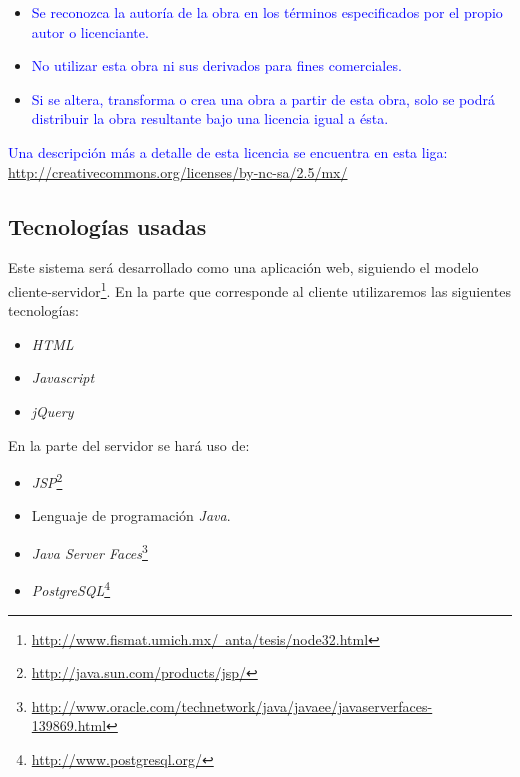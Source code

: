 \documentclass[11pt,letterpaper,titlepage]{article}
\begin{document}
\begin{itemize}
 \item \textcolor{blue}{Se reconozca la autor\'ia de la obra en los t\'erminos especificados por el propio autor o licenciante.}
 \item \textcolor{blue}{No utilizar esta obra ni sus derivados para fines comerciales.}
 \item \textcolor{blue}{Si se altera, transforma o crea una obra a partir de esta obra, solo se podr\'a distribuir la obra resultante bajo una licencia igual a \'esta.}
\end{itemize}

\textcolor{blue}{Una descripci\'on m\'as a detalle de esta licencia se encuentra en esta liga: \\\href{http://creativecommons.org/licenses/by-nc-sa/2.5/mx/}{http://creativecommons.org/licenses/by-nc-sa/2.5/mx/}}
 



\subsection{Tecnolog\'ias usadas}
Este sistema ser\'a desarrollado como una aplicaci\'on web, siguiendo el modelo cliente-servidor\footnote{\href{http://www.fismat.umich.mx/~anta/tesis/node32.html}{http://www.fismat.umich.mx/~anta/tesis/node32.html}}. En la parte que corresponde al cliente utilizaremos las siguientes tecnolog\'ias:


\begin{itemize}
 \item \textit{HTML}
 \item \textit{Javascript}
 \item \textit{jQuery}
\end{itemize}
En la parte del servidor se har\'a uso de:
\begin{itemize}
 \item \textit{JSP}\footnote{\href{http://java.sun.com/products/jsp/}{http://java.sun.com/products/jsp/}}

 \item Lenguaje de programaci\'on \textit{Java}.
 \item \textit{Java Server Faces}\footnote{\href{http://www.oracle.com/technetwork/java/javaee/javaserverfaces-139869.html}{http://www.oracle.com/technetwork/java/javaee/javaserverfaces-139869.html}}
 \item \textit{PostgreSQL}\footnote{\href{http://www.postgresql.org/}{http://www.postgresql.org/}}
\end{itemize}
\end{document}
